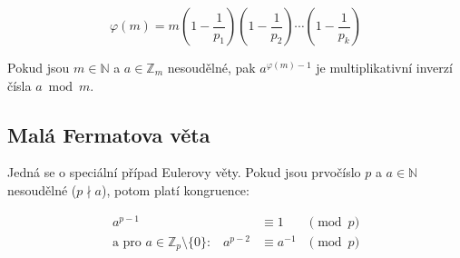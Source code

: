\documentclass[a4paper]{article}
\newcommand{\Z}{\mathbb{Z}}
\newcommand{\N}{\mathbb{N}}
\begin{document}
\[
    \varphi(m) = m
    \left( 1 - \frac{1}{p_1} \right)
    \left( 1 - \frac{1}{p_2} \right)\cdots
    \left( 1 - \frac{1}{p_k} \right)
\]

Pokud jsou $m \in \N$ a $a \in \Z_m$ nesoudělné, pak $a^{\varphi(m)-1}$ je multiplikativní inverzí čísla $a \bmod m$.

\subsection{Malá Fermatova věta}

Jedná se o speciální případ Eulerovy věty. Pokud jsou prvočíslo $p$ a $a \in \mathbb N$ nesoudělné ($p \nmid a$), potom platí kongruence:

\[
    \begin{array}{rll}
        a^{p-1}                                               & \equiv 1      & \pmod{p} \\
        \text{a pro $a\in \Z_p\setminus\{0\}$:} \quad a^{p-2} & \equiv a^{-1} & \pmod p
    \end{array}
\]
\end{document}
